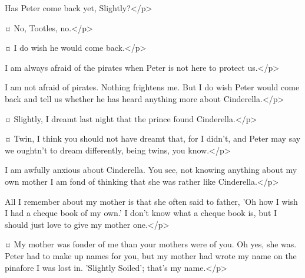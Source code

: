 \begin{drama}

\tootlesspeaks
Has Peter come back yet, Slightly?</p>

\slightlyspeaks {}¤
No, Tootles, no.</p>


\curlyspeaks {}¤
I do wish he would come back.</p>

\tootlesspeaks
I am always afraid of the pirates when Peter is not here to protect us.</p>

\slightlyspeaks
I am not afraid of pirates.
Nothing frightens me.
But I do wish Peter would come back and tell us whether he has heard anything more about Cinderella.</p>

\secondtwinspeaks {}¤
Slightly, I dreamt last night that the prince found Cinderella.</p>

\firsttwinspeaks {}¤
Twin, I think you should not have dreamt that, for I didn't, and Peter may say we oughtn't to dream differently, being twins, you know.</p>

\tootlesspeaks
I am awfully anxious about Cinderella.
You see, not knowing anything about my own mother I am fond of thinking that she was rather like Cinderella.</p>


\nibsspeaks
All I remember about my mother is that she often said to father, 'Oh how I wish I had a cheque book of my own.'
I don't know what a cheque book is, but I should just love to give my mother one.</p>

\slightlyspeaks {}¤
My mother was fonder of me than your mothers were of you.
Oh yes, she was.
Peter had to make up names for you, but my mother had wrote my name on the pinafore I was lost in.
'Slightly Soiled'; that's my name.</p>

\end{drama}

